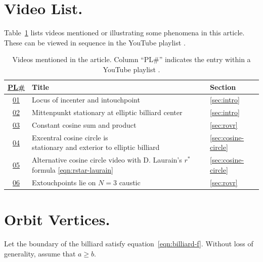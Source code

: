 \documentclass{article}
\theoremstyle{definition}
\begin{document}
\appendix
\section{Video List.} 
\label{app:videos}
Table~\ref{tab:playlist} lists videos mentioned or illustrating some phenomena in this article. These can be viewed in sequence in the YouTube playlist \cite{reznik2020-playlist-proofs}.

\begin{table}[H]
\caption{Videos mentioned in the article. Column ``PL\#'' indicates the entry within a YouTube playlist \cite{reznik2020-playlist-proofs}.}
\begin{tabular}{c|l|l}
\href{https://bit.ly/2Gmn73e}{PL\#} & Title & Section\\
\hline

\href{https://youtu.be/9xU6T7hQMzs}{01} &
{Locus of incenter and intouchpoint} & \ref{sec:intro} \\

\href{https://youtu.be/tMrBqfRBYik}{02} &
{Mittenpunkt stationary at elliptic billiard center} & \ref{sec:intro} \\

\href{https://youtu.be/P8ykpE_ZbZ8}{03} &
{Constant cosine sum and product} &
\ref{sec:rovr} \\

\href{https://youtu.be/ACinCf-D_Ok}{04} &
\makecell[lt]{Excentral cosine circle is\\stationary and exterior to elliptic billiard} &
\ref{sec:cosine-circle}\\

\href{https://youtu.be/hCQIT6_XhaQ}{05} &
\makecell[lt]{Alternative cosine circle video\\with D. Laurain's $r^*$ formula \eqref{eqn:rstar-laurain}} &
\ref{sec:cosine-circle}\\

\href{https://youtu.be/1gYb5Y3-rQI}{06} & Extouchpoints lie on $N=3$ caustic
 &
\ref{sec:rovr}\\

\end{tabular}
\label{tab:playlist}
\end{table}

\section{Orbit Vertices.}
\label{app:orbit-vertices}
Let the boundary of the billiard satisfy equation~\eqref{eqn:billiard-f}. Without loss of generality, assume that $a {\ge} b$.
\end{document}
